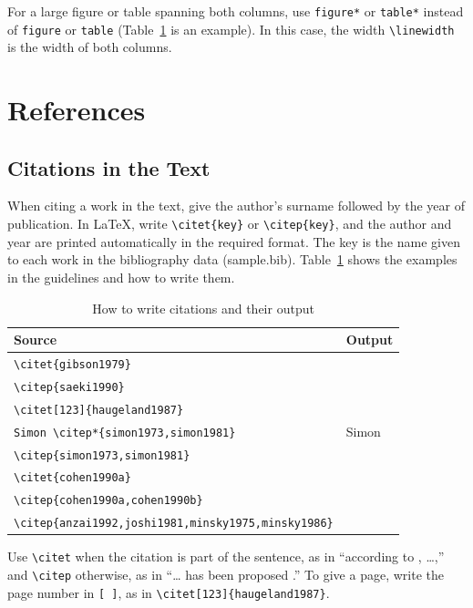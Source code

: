\documentclass[paper,english]{bunkajoho}
\begin{document}
For a large figure or table spanning both columns, use \verb|figure*| or \verb|table*| instead of \verb|figure| or \verb|table| (Table~\ref{tab:cite} is an example).
In this case, the width \verb|\linewidth| is the width of both columns.

\section{References}

\subsection{Citations in the Text}

When citing a work in the text, give the author's surname followed by the year of publication.
In \LaTeX, write \verb|\citet{key}| or \verb|\citep{key}|, and the author and year are printed automatically in the required format.
The key is the name given to each work in the bibliography data (sample.bib).
Table~\ref{tab:cite} shows the examples in the guidelines and how to write them.

\begin{table}[tb]
  \centering
  \caption{How to write citations and their output}
  \label{tab:cite}
  \footnotesize
  \begin{tabular}{ll}
    \toprule
    Source & Output \\
    \midrule
    \verb|\citet{gibson1979}| & \citet{gibson1979} \\
    \verb|\citep{saeki1990}| & \citep{saeki1990} \\
    \verb|\citet[123]{haugeland1987}| & \citet[123]{haugeland1987} \\
    \verb|Simon \citep*{simon1973,simon1981}| & Simon \citep*{simon1973,simon1981} \\
    \verb|\citep{simon1973,simon1981}| & \citep{simon1973,simon1981} \\
    \verb|\citet{cohen1990a}| & \citet{cohen1990a} \\
    \verb|\citep{cohen1990a,cohen1990b}| & \citep{cohen1990a,cohen1990b} \\
    \verb|\citep{anzai1992,joshi1981,minsky1975,minsky1986}| & \citep{anzai1992,joshi1981,minsky1975,minsky1986} \\
    \bottomrule
  \end{tabular}
\end{table}

Use \verb|\citet| when the citation is part of the sentence, as in ``according to \citet{gibson1979}, \ldots,'' and \verb|\citep| otherwise, as in ``\ldots{} has been proposed \citep{saeki1990}.''
To give a page, write the page number in \verb|[ ]|, as in \verb|\citet[123]{haugeland1987}|.
\end{document}
